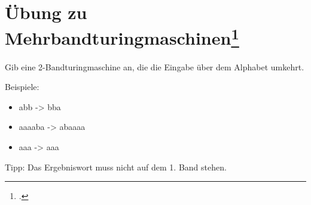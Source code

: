 \documentclass{lehramt-informatik-aufgabe}
\begin{document}
%

\section{Übung zu Mehrbandturingmaschinen\footcite[Seite 28]{theo:fs:3}}

Gib eine 2-Bandturingmaschine an, die die Eingabe über dem
Alphabet  umkehrt.

Beispiele:

\begin{itemize}
\item abb -> bba
\item aaaaba -> abaaaa
\item aaa -> aaa
\end{itemize}

Tipp: Das Ergebniswort muss nicht auf dem 1. Band stehen.
\end{document}
